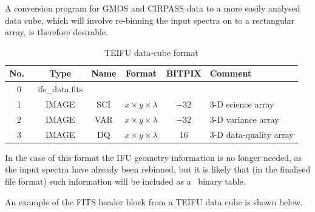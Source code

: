 \documentclass[twoside,11pt]{article}
\newcommand{\htmlref}[2]{#1}
\begin{document}
\begin{\htmlonly}
A \htmlref{conversion program}{sc16_mef2cub} for GMOS and CIRPASS data
to a more easily analysed data cube, which will involve re-binning the
input spectra on to a rectangular array, is therefore
desirable.

\begin{table}[h]
\begin{center}
\begin{tabular}{cccccl}
No.\ & Type  & Name & Format & BITPIX & Comment\\\hline 
0 &ifs\_data.fits &  &          &       & \\
1 & IMAGE & SCI & $x \times y\times \lambda$ & $-$32 & 3-D science array \\
2 & IMAGE & VAR & $x \times y\times \lambda$ & $-$32 & 3-D variance array \\
3 & IMAGE & DQ  & $x \times y\times \lambda$ &    16 & 3-D data-quality array \\ \hline
\end{tabular}
\caption{TEIFU data-cube format}
\end{center}
\protect\label{tab:cub_file}
\end{table} 

In the case of this format the IFU geometry information is no longer
needed, as the input spectra have already been rebinned, but it is
likely that (in the finalised file format) such information will be
included as a \FITSref\  binary table.

An example of the FITS header block from a TEIFU data cube is shown below.


\end{\htmlonly}
\end{document}
